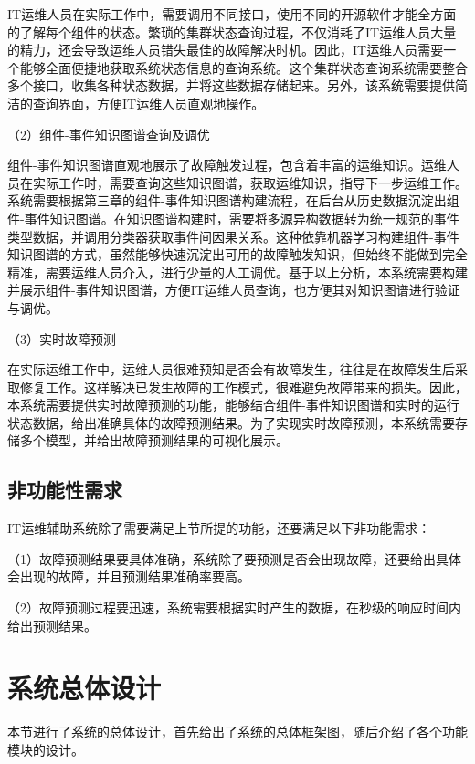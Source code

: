 IT运维人员在实际工作中，需要调用不同接口，使用不同的开源软件才能全方面的了解每个组件的状态。繁琐的集群状态查询过程，不仅消耗了IT运维人员大量的精力，还会导致运维人员错失最佳的故障解决时机。因此，IT运维人员需要一个能够全面便捷地获取系统状态信息的查询系统。这个集群状态查询系统需要整合多个接口，收集各种状态数据，并将这些数据存储起来。另外，该系统需要提供简洁的查询界面，方便IT运维人员直观地操作。

（2）组件-事件知识图谱查询及调优

组件-事件知识图谱直观地展示了故障触发过程，包含着丰富的运维知识。运维人员在实际工作时，需要查询这些知识图谱，获取运维知识，指导下一步运维工作。系统需要根据第三章的组件-事件知识图谱构建流程，在后台从历史数据沉淀出组件-事件知识图谱。在知识图谱构建时，需要将多源异构数据转为统一规范的事件类型数据，并调用分类器获取事件间因果关系。这种依靠机器学习构建组件-事件知识图谱的方式，虽然能够快速沉淀出可用的故障触发知识，但始终不能做到完全精准，需要运维人员介入，进行少量的人工调优。基于以上分析，本系统需要构建并展示组件-事件知识图谱，方便IT运维人员查询，也方便其对知识图谱进行验证与调优。

（3）实时故障预测

在实际运维工作中，运维人员很难预知是否会有故障发生，往往是在故障发生后采取修复工作。这样解决已发生故障的工作模式，很难避免故障带来的损失。因此，本系统需要提供实时故障预测的功能，能够结合组件-事件知识图谱和实时的运行状态数据，给出准确具体的故障预测结果。为了实现实时故障预测，本系统需要存储多个模型，并给出故障预测结果的可视化展示。


\subsection{非功能性需求}
IT运维辅助系统除了需要满足上节所提的功能，还要满足以下非功能需求：

（1）故障预测结果要具体准确，系统除了要预测是否会出现故障，还要给出具体会出现的故障，并且预测结果准确率要高。

（2）故障预测过程要迅速，系统需要根据实时产生的数据，在秒级的响应时间内给出预测结果。


\section{系统总体设计}
本节进行了系统的总体设计，首先给出了系统的总体框架图，随后介绍了各个功能模块的设计。
